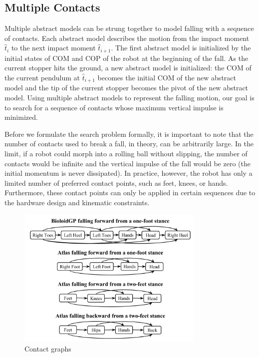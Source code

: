 \subsection{Multiple Contacts}
Multiple abstract models can be strung together to model falling with
a sequence of contacts. Each abstract model describes the motion from
the impact moment $\hat{t}_i$ to the next impact moment
$\hat{t}_{i+1}$. The first abstract model is initialized by the
initial states of COM and COP of the robot at the beginning of the
fall. As the current stopper hits the ground, a new abstract
model is initialized: the COM of the current pendulum at $\hat{t}_{i+1}$ becomes the
initial COM of the new abstract model and the tip of the current
stopper becomes the pivot of the new abstract model. Using multiple
abstract models to represent the falling motion, our goal is to search
for a sequence of contacts whose maximum vertical impulse is
minimized.

Before we formulate the search problem formally, it is important to
note that the number of contacts used to break a fall, in theory, can
be arbitrarily large. In the limit, if a robot could morph into a
rolling ball without slipping, the number of contacts would be infinite and
the vertical impulse of the fall would be zero (the initial momentum is never
dissipated). In practice, however, the robot has only a limited number
of preferred contact points, such as feet, knees, or
hands. Furthermore, these contact points can only be applied in
certain sequences due to the hardware design and kinematic
constraints. 

\begin{figure}[ht]
\center
  \includegraphics[width=0.8\textwidth]{images/all_contact_graphs.png}
  \caption{Contact graphs}
  \label{fig:falling_contact_graph}
\end{figure}

